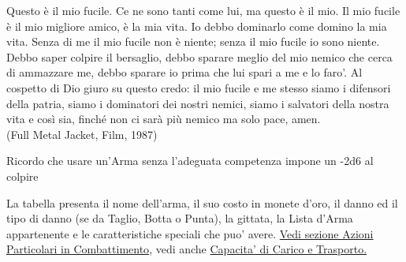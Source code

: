\documentclass[a4paper,11pt,twoside,openany]{book}
\begin{document}
\label{equipaggiamento---armi}
\begin{tcolorbox}[enhanced,arc=5pt,boxrule=0.3pt]{
Questo è il mio fucile. Ce ne sono tanti come lui, ma questo è il mio. Il mio fucile è il mio migliore amico, è la mia vita. Io debbo dominarlo come domino la mia vita. Senza di me il mio fucile non è niente; senza il mio fucile io sono niente. Debbo saper colpire il bersaglio, debbo sparare meglio del mio nemico che cerca di ammazzare me, debbo sparare io prima che lui spari a me e lo faro'. Al cospetto di Dio giuro su questo credo: il mio fucile e me stesso siamo i difensori della patria, siamo i dominatori dei nostri nemici, siamo i salvatori della nostra vita e così sia, finché non ci sarà più nemico ma solo pace, amen.
\\
(Full Metal Jacket, Film, 1987)}\end{tcolorbox}\medskip

Ricordo che usare un'Arma senza l'adeguata competenza impone un -2d6 al colpire

La tabella presenta il nome dell'arma, il suo costo in monete d'oro, il danno ed il tipo di danno (se da Taglio, Botta o Punta), la gittata, la Lista d'Arma appartenente e le caratteristiche speciali che puo' avere. \hyperref[sec:Azioni particolari in combattimento]{Vedi sezione Azioni Particolari in Combattimento}, vedi anche \hyperref[sec:capacita-di-carico-e-trasporto-ingombro]{Capacita' di Carico e Trasporto.}

\bigskip
\end{document}
